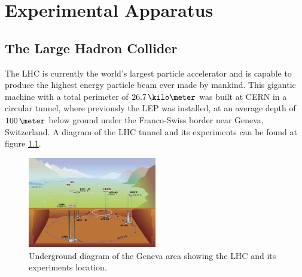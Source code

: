 \chapter{Experimental Apparatus}
\label{CHAPTER:ExperimentalApparatus}

\section{The Large Hadron Collider}
\label{SECTION:ExperimentalApparatus_LHC}

%

%  

The \gls{LHC}\cite{ARTICLE:LHC Machine} is currently the world's largest particle accelerator and is capable to produce the highest energy particle beam ever made by mankind. This gigantic machine with a total perimeter of $26.7\,\kilo\meter$ was built at \gls{CERN} in a circular tunnel, where previously the \gls{LEP}\cite{LEPTDR:LEPInjectorStudyGroup} was installed, at an average depth of $100\,\meter$ below ground under the Franco-Swiss border near Geneva, Switzerland. A diagram of the \gls{LHC} tunnel and its experiments can be found at figure \ref{FIGURE:ExperimentalApparatus_LHCLayoutUnderground}.

\begin{figure}[!htb]
  \centering
  \includegraphics[width=0.50\textwidth]{Chapter02/LHC/Images/LHC_layout_underground.jpg}
  \caption{Underground diagram of the Geneva area showing the \gls{LHC} and its experiments location.}
  \label{FIGURE:ExperimentalApparatus_LHCLayoutUnderground}
\end{figure}

